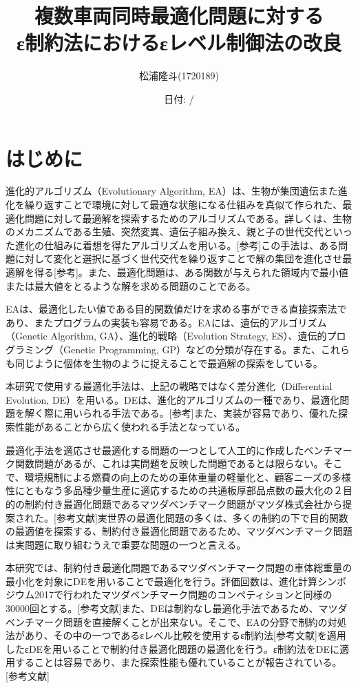 \documentclass[12pt,a4paper]{jreport}
\title{複数車両同時最適化問題に対する
\\ε制約法におけるεレベル制御法の改良}
\author{松浦隆斗(1720189)}
\date{日付: /}
\begin{document}
\maketitle
\section{はじめに}
進化的アルゴリズム（Evolutionary Algorithm, EA）は、生物が集団遺伝また進化を繰り返すことで環境に対して最適な状態になる仕組みを真似て作られた、最適化問題に対して最適解を探索するためのアルゴリズムである。詳しくは、生物のメカニズムである生殖、突然変異、遺伝子組み換え、親と子の世代交代といった進化の仕組みに着想を得たアルゴリズムを用いる。[参考]この手法は、ある問題に対して変化と選択に基づく世代交代を繰り返すことで解の集団を進化させ最適解を得る[参考]。また、最適化問題は、ある関数が与えられた領域内で最小値または最大値をとるような解を求める問題のことである。

EAは、最適化したい値である目的関数値だけを求める事ができる直接探索法であり、またプログラムの実装も容易である。EAには、遺伝的アルゴリズム（Genetic Algorithm, GA）、進化的戦略（Evolution Strategy, ES）、遺伝的プログラミング（Genetic Programming, GP）などの分類が存在する。また、これらも同じように個体を生物のように捉えることで最適解の探索をしている。

本研究で使用する最適化手法は、上記の戦略ではなく差分進化（Differential Evolution, DE）を用いる。DEは、進化的アルゴリズムの一種であり、最適化問題を解く際に用いられる手法である。[参考]また、実装が容易であり、優れた探索性能があることから広く使われる手法となっている。


最適化手法を適応させ最適化する問題の一つとして人工的に作成したベンチマーク関数問題があるが、これは実問題を反映した問題であるとは限らない。そこで、環境規制による燃費の向上のための車体重量の軽量化と、顧客ニーズの多様性にともなう多品種少量生産に適応するための共通板厚部品点数の最大化の２目的の制約付き最適化問題であるマツダベンチマーク問題がマツダ株式会社から提案された。[参考文献]実世界の最適化問題の多くは、多くの制約の下で目的関数の最適値を探索する、制約付き最適化問題であるため、マツダベンチマーク問題は実問題に取り組むうえで重要な問題の一つと言える。


本研究では、制約付き最適化問題であるマツダベンチマーク問題の車体総重量の最小化を対象にDEを用いることで最適化を行う。評価回数は、進化計算シンポジウム2017で行われたマツダベンチマーク問題のコンペティションと同様の30000回とする。[参考文献]また、DEは制約なし最適化手法であるため、マツダベンチマーク問題を直接解くことが出来ない。そこで、EAの分野で制約の対処法があり、その中の一つであるεレベル比較を使用するε制約法[参考文献]を適用したεDEを用いることで制約付き最適化問題の最適化を行う。ε制約法をDEに適用することは容易であり、また探索性能も優れていることが報告されている。[参考文献]
\end{document}
